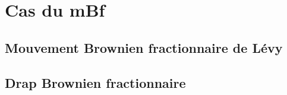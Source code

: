 \section{Cas du mBf}
\subsection{Mouvement Brownien fractionnaire de Lévy}

\subsection{Drap Brownien fractionnaire}
